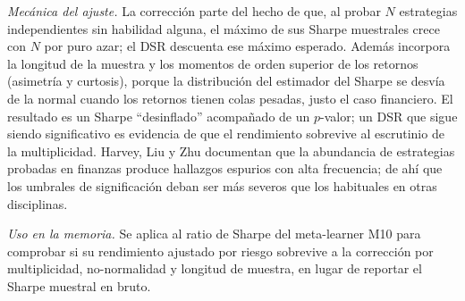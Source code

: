 \emph{Mecánica del ajuste.} La corrección parte del hecho de que, al probar $N$ estrategias independientes sin habilidad alguna, el máximo de sus Sharpe muestrales crece con $N$ por puro azar; el DSR descuenta ese máximo esperado. Además incorpora la longitud de la muestra y los momentos de orden superior de los retornos (asimetría y curtosis), porque la distribución del estimador del Sharpe se desvía de la normal cuando los retornos tienen colas pesadas, justo el caso financiero. El resultado es un Sharpe ``desinflado'' acompañado de un $p$-valor; un DSR que sigue siendo significativo es evidencia de que el rendimiento sobrevive al escrutinio de la multiplicidad. Harvey, Liu y Zhu \cite{harvey2016} documentan que la abundancia de estrategias probadas en finanzas produce hallazgos espurios con alta frecuencia; de ahí que los umbrales de significación deban ser más severos que los habituales en otras disciplinas.

\emph{Uso en la memoria.} Se aplica al ratio de Sharpe del meta-learner M10 para comprobar si su rendimiento ajustado por riesgo sobrevive a la corrección por multiplicidad, no-normalidad y longitud de muestra, en lugar de reportar el Sharpe muestral en bruto.

